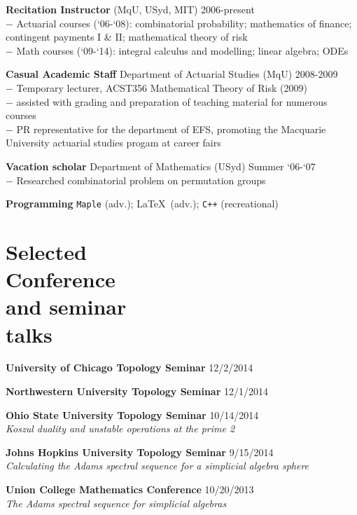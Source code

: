 \documentclass[margin,line]{resume}
\newcommand{\CVsection}[1]{\section{\mysidestyle #1}}
\newcommand{\entry}[3]{\textbf{#1} #2 \hfill {#3}
           
\vspace{-3.1mm}}
\newcommand{\twolineentry}[4]{\textbf{#1} #2 \hfill {#4}\\%
#3
           
\vspace{-3.1mm}}
\newcommand{\FINALentry}[3]{\textbf{#1} #2 \hfill {#3}}
\newcommand{\FINALtwolineentry}[4]{\textbf{#1} #2 \hfill {#4}\\%
#3}
\begin{document}
\begin{resume}
\twolineentry{Recitation Instructor}{(MqU, USyd, MIT)}{
\phantom{space}$-$ Actuarial courses (`06-`08): combinatorial probability; mathematics of finance;\\
\phantom{space$-$ }contingent payments I \& II; mathematical theory of risk \\
\phantom{space}$-$ Math courses (`09-`14): integral calculus and modelling; linear algebra; ODEs
}{2006-present}
\twolineentry{Casual Academic Staff}{Department of Actuarial Studies (MqU)}{%
\phantom{space}$-$ Temporary lecturer, ACST356 Mathematical Theory of Risk (2009)\\
\phantom{space}$-$ assisted with grading and preparation of teaching material for numerous courses\\
\phantom{space}$-$ PR representative for the department of EFS, promoting the Macquarie\\\phantom{space$-$ }University actuarial studies progam at career fairs%
}{2008-2009}
\twolineentry{Vacation scholar}{Department of Mathematics (USyd)}{%
\phantom{space}$-$ Researched combinatorial problem on permutation groups
}{Summer `06-`07}
\FINALentry{Programming}{\texttt{Maple} (adv.); \LaTeX\ (adv.); \texttt{C++} (recreational)}{}

\CVsection{Selected\\Conference\\and seminar\\talks}
\entry{University of Chicago Topology Seminar}{}{12/2/2014}
\entry{Northwestern University Topology Seminar}{}{12/1/2014}
\twolineentry{Ohio State University Topology Seminar}{}{\emph{Koszul duality and unstable operations at the prime 2}}{10/14/2014}
\twolineentry{Johns Hopkins University Topology Seminar}{}{\emph{Calculating the Adams spectral sequence for a simplicial algebra sphere}}{9/15/2014}
\FINALtwolineentry{Union College Mathematics Conference}{}{\emph{The Adams spectral sequence for simplicial algebras}}{10/20/2013}


\end{resume}
\end{document}
